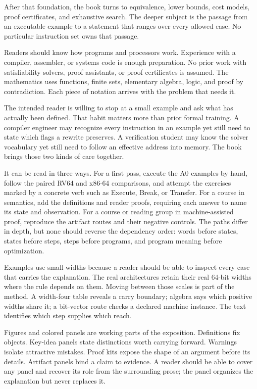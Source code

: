 After that foundation, the book turns to equivalence, lower bounds, cost
models, proof certificates, and exhaustive search. The deeper subject is the
passage from an executable example to a statement that ranges over every
allowed case. No particular instruction set owns that passage.

Readers should know how programs and processors work. Experience with
a compiler, assembler, or systems code is enough preparation. No prior work
with satisfiability solvers, proof assistants, or proof certificates is
assumed. The mathematics uses functions, finite sets, elementary algebra,
logic, and proof by contradiction. Each piece of notation arrives with the
problem that needs it.

The intended reader is willing to stop at a small example and ask what has
actually been defined. That habit matters more than prior formal training. A
compiler engineer may recognize every instruction in an example yet still
need to state which flags a rewrite preserves. A verification student may
know the solver vocabulary yet still need to follow an effective address into
memory. The book brings those two kinds of care together.

It can be read in three ways. For a first pass, execute the A0 examples by
hand, follow the paired RV64 and x86-64 comparisons, and attempt the exercises
marked by a concrete verb such as Execute, Break, or Transfer. For a course in
semantics, add the definitions and reader proofs, requiring each answer to
name its state and observation. For a course or reading group in
machine-assisted proof, reproduce the artifact routes and their negative
controls. The paths differ in depth, but none should reverse the dependency
order: words before states, states before steps, steps before programs, and
program meaning before optimization.

Examples use small widths because a reader should be able to inspect every
case that carries the explanation. The real architectures retain their real
64-bit widths where the rule depends on them. Moving between those scales is
part of the method. A width-four table reveals a carry boundary; algebra says
which positive widths share it; a bit-vector route checks a declared machine
instance. The text identifies which step supplies which reach.

Figures and colored panels are working parts of the exposition. Definitions
fix objects. Key-idea panels state distinctions worth carrying forward.
Warnings isolate attractive mistakes. Proof kits expose the shape of an
argument before its details. Artifact panels bind a claim to evidence. A
reader should be able to cover any panel and recover its role from the
surrounding prose; the panel organizes the explanation but never replaces it.

